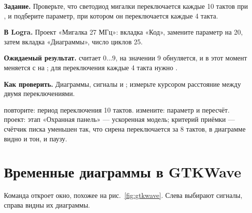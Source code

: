 \begin{diybox}
\textbf{Задание.} Проверьте, что светодиод мигалки переключается каждые 10 тактов при , и подберите параметр, при котором он переключается каждые 4 такта.

\textbf{В Logra.} Проект «Мигалка 27 МГц»: вкладка «Код», замените параметр  на 20, затем вкладка «Диаграммы», число циклов 25.

\textbf{Ожидаемый результат.}  считает $0\ldots9$, на значении 9 обнуляется, и в этот момент  меняется с  на ; для переключения каждые 4 такта нужно .

\textbf{Как проверить.} Диаграммы, сигналы  и ; измерьте курсором расстояние между двумя переключениями.

 повторите: период переключения 10 тактов.  измените: параметр  и пересчёт.  проект: этап «Охранная панель» --- ускоренная модель; критерий приёмки --- счётчик писка уменьшен так, что сирена переключается за 8 тактов, в диаграмме видно и тон, и паузу.
\end{diybox}

\section{Временные диаграммы в GTKWave}

Команда  откроет окно, похожее на
рис.~\ref{fig:gtkwave}. Слева выбирают сигналы, справа видны их диаграммы.

